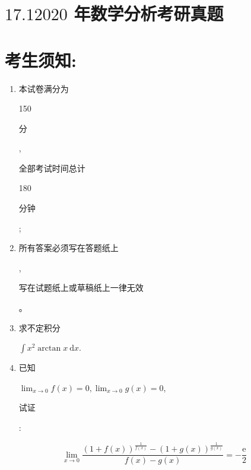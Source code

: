 \documentclass[10pt]{article}
\begin{document}
\section{$17.12020$ 年数学分析考研真题}
\section{考生须知:}
\begin{enumerate}
  \item \begin{CJK}{UTF8}{mj}本试卷满分为\end{CJK} 150 \begin{CJK}{UTF8}{mj}分\end{CJK}, \begin{CJK}{UTF8}{mj}全部考试时间总计\end{CJK} 180 \begin{CJK}{UTF8}{mj}分钟\end{CJK};

  \item \begin{CJK}{UTF8}{mj}所有答案必须写在答题纸上\end{CJK}, \begin{CJK}{UTF8}{mj}写在试题纸上或草稿纸上一律无效\end{CJK}。

  \item \begin{CJK}{UTF8}{mj}求不定积分\end{CJK} $\int x^{2} \arctan x \mathrm{~d} x$.

  \item \begin{CJK}{UTF8}{mj}已知\end{CJK} $\lim _{x \rightarrow 0} f(x)=0, \lim _{x \rightarrow 0} g(x)=0$, \begin{CJK}{UTF8}{mj}试证\end{CJK}:

\end{enumerate}
$$
\lim _{x \rightarrow 0} \frac{(1+f(x))^{\frac{1}{f(x)}}-(1+g(x))^{\frac{1}{g(x)}}}{f(x)-g(x)}=-\frac{\mathrm{e}}{2}
$$
\end{document}
